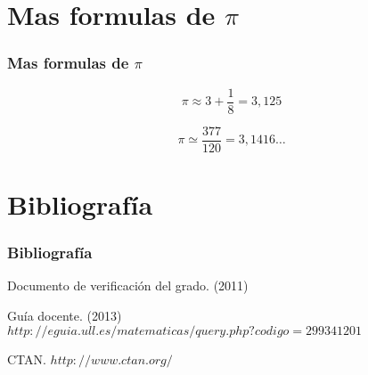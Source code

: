 \documentclass{beamer}
\begin{document}
\section {Mas formulas de $\pi$ }
\begin{frame}

\frametitle{Mas formulas de $\pi$}
\begin{definition}
\begin{equation}
\pi \approx 3 + \frac{1}{8} = 3,125 
\end{equation}
\end{definition}

\begin{definition}
\begin{equation}
\pi \simeq \frac{377}{120} = 3{,}1416 \ldots 
\end{equation}
\end{definition}


\end{frame}

\section{Bibliografía}
\begin{frame}
  \frametitle{Bibliografía}

  \begin{thebibliography}{10}

    \beamertemplatebookbibitems
    Documento de verificación del grado. 
    (2011) 

    \beamertemplatebookbibitems
    Guía docente. 
    (2013) 
    {\small $http://eguia.ull.es/matematicas/query.php?codigo=299341201$}

    \beamertemplatebookbibitems
    CTAN. {\small $http://www.ctan.org/$}

  \end{thebibliography}
\end{frame}

\end{document}
